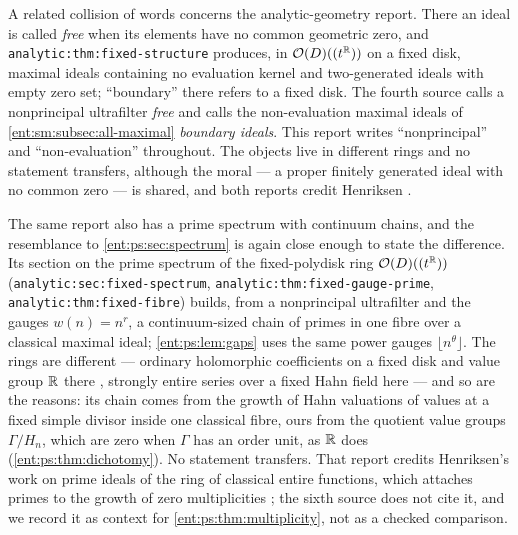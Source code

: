 \documentclass[11pt]{article}
\theoremstyle{plain}
\theoremstyle{plain}
\theoremstyle{plain}
\theoremstyle{definition}
\theoremstyle{definition}
\theoremstyle{definition}
\theoremstyle{definition}
\theoremstyle{remark}
\begin{document}
A related collision of words concerns the analytic-geometry report. There an
ideal is called \emph{free} when its elements have no common geometric zero,
and \texttt{analytic:thm:fixed-structure} produces, in $\mathcal
O(D)((t^\mathbb R))$ on a fixed disk, maximal ideals containing no evaluation kernel
and two-generated ideals with empty zero set; ``boundary'' there refers to a
fixed disk. The fourth source calls a nonprincipal ultrafilter \emph{free}
and calls the non-evaluation maximal ideals of
\cref{ent:sm:subsec:all-maximal} \emph{boundary ideals}. This report writes
``nonprincipal'' and ``non-evaluation'' throughout. The objects live in
different rings and no statement transfers, although the moral --- a proper
finitely generated ideal with no common zero --- is shared, and both reports
credit Henriksen \cite{Henriksen}.

The same report also has a prime spectrum with continuum chains, and the
resemblance to \cref{ent:ps:sec:spectrum} is again close enough to state the
difference. Its section on the prime spectrum of the fixed-polydisk ring
$\mathcal O(D)((t^\mathbb R))$ (\texttt{analytic:sec:fixed-spectrum},
\texttt{analytic:thm:fixed-gauge-prime}, \texttt{analytic:thm:fixed-fibre})
builds, from a nonprincipal ultrafilter and the gauges $w(n)=n^r$, a
continuum-sized chain of primes in one fibre over a classical maximal
ideal; \cref{ent:ps:lem:gaps} uses the same power gauges $\lfloor
n^\theta\rfloor$. The rings are different --- ordinary holomorphic
coefficients on a fixed disk and value group $\mathbb R$ there
\cite{RepoAnalyticGeometry}, strongly entire
series over a fixed Hahn field here --- and so are the reasons: its chain
comes from the growth of Hahn valuations of values at a fixed simple divisor
inside one classical fibre, ours from the quotient value groups
$\Gamma/H_n$, which are zero when $\Gamma$ has an order unit, as $\mathbb R$ does
(\cref{ent:ps:thm:dichotomy}). No statement transfers. That report credits
Henriksen's work on prime ideals of the ring of classical entire functions,
which attaches primes to the growth of zero multiplicities
\cite{Henriksen53}; the sixth source does not cite it, and we record it as
context for \cref{ent:ps:thm:multiplicity}, not as a checked comparison.
\end{document}

